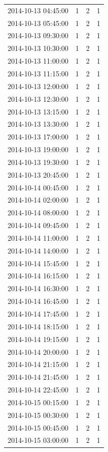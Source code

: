 \begin{tabular}{lrrr}
2014-10-13 04:45:00 & 1 & 2 & 1 \\
2014-10-13 05:45:00 & 1 & 2 & 1 \\
2014-10-13 09:30:00 & 1 & 2 & 1 \\
2014-10-13 10:30:00 & 1 & 2 & 1 \\
2014-10-13 11:00:00 & 1 & 2 & 1 \\
2014-10-13 11:15:00 & 1 & 2 & 1 \\
2014-10-13 12:00:00 & 1 & 2 & 1 \\
2014-10-13 12:30:00 & 1 & 2 & 1 \\
2014-10-13 13:15:00 & 1 & 2 & 1 \\
2014-10-13 13:30:00 & 1 & 2 & 1 \\
2014-10-13 17:00:00 & 1 & 2 & 1 \\
2014-10-13 19:00:00 & 1 & 2 & 1 \\
2014-10-13 19:30:00 & 1 & 2 & 1 \\
2014-10-13 20:45:00 & 1 & 2 & 1 \\
2014-10-14 00:45:00 & 1 & 2 & 1 \\
2014-10-14 02:00:00 & 1 & 2 & 1 \\
2014-10-14 08:00:00 & 1 & 2 & 1 \\
2014-10-14 09:45:00 & 1 & 2 & 1 \\
2014-10-14 11:00:00 & 1 & 2 & 1 \\
2014-10-14 14:00:00 & 1 & 2 & 1 \\
2014-10-14 15:45:00 & 1 & 2 & 1 \\
2014-10-14 16:15:00 & 1 & 2 & 1 \\
2014-10-14 16:30:00 & 1 & 2 & 1 \\
2014-10-14 16:45:00 & 1 & 2 & 1 \\
2014-10-14 17:45:00 & 1 & 2 & 1 \\
2014-10-14 18:15:00 & 1 & 2 & 1 \\
2014-10-14 19:15:00 & 1 & 2 & 1 \\
2014-10-14 20:00:00 & 1 & 2 & 1 \\
2014-10-14 21:15:00 & 1 & 2 & 1 \\
2014-10-14 21:45:00 & 1 & 2 & 1 \\
2014-10-14 22:45:00 & 1 & 2 & 1 \\
2014-10-15 00:15:00 & 1 & 2 & 1 \\
2014-10-15 00:30:00 & 1 & 2 & 1 \\
2014-10-15 00:45:00 & 1 & 2 & 1 \\
2014-10-15 03:00:00 & 1 & 2 & 1 \\

\end{tabular}
